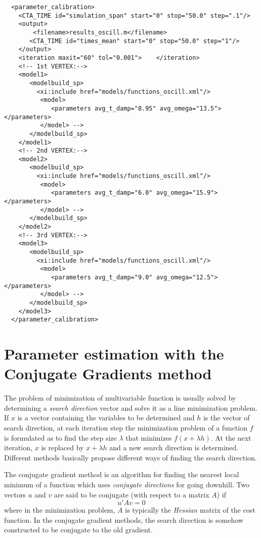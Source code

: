 \begin{verbatim}
  <parameter_calibration>
    <CTA_TIME id="simulation_span" start="0" stop="50.0" step=".1"/>
    <output>
        <filename>results_oscill.m</filename> 
       <CTA_TIME id="times_mean" start="0" stop="50.0" step="1"/>
    </output>
    <iteration maxit="60" tol="0.001">    </iteration>
    <!-- 1st VERTEX:-->
    <model1>
       <modelbuild_sp>
         <xi:include href="models/functions_oscill.xml"/>
          <model>  
             <parameters avg_t_damp="8.95" avg_omega="13.5"> </parameters> 
          </model> -->  
       </modelbuild_sp> 
    </model1>
    <!-- 2nd VERTEX:-->
    <model2>
       <modelbuild_sp>
         <xi:include href="models/functions_oscill.xml"/>
          <model>  
             <parameters avg_t_damp="6.0" avg_omega="15.9"> </parameters> 
          </model> -->  
       </modelbuild_sp> 
    </model2>
    <!-- 3rd VERTEX:-->
    <model3>
       <modelbuild_sp>
         <xi:include href="models/functions_oscill.xml"/>
          <model>  
             <parameters avg_t_damp="9.0" avg_omega="12.5"> </parameters> 
          </model> -->  
       </modelbuild_sp> 
    </model3>
  </parameter_calibration>
\end{verbatim}

\section{Parameter estimation with the Conjugate Gradients method}
\label{sssec.conjugrad}
The problem of minimization of multivariable function is usually solved by
determining a \emph{search direction} vector and solve it as a line
minimization problem. If $x$ is a vector containing the variables to be
determined and $h$ is the vector of search direction, at each iteration
step the minimization problem of a function $f$ is formulated as to find
the step size $\lambda$ that minimizes $f(x+\lambda h)$. At the next
iteration, $x$ is replaced by $x+\lambda h$ and a new search direction is
determined. Different methods basically propose different ways of finding
the search direction.

The conjugate gradient method is an algorithm for finding the nearest local
minimum of a function which uses \emph{conjugate directions} for going
downhill. Two vectors $u$ and $v$ are said to be conjugate (with respect to
a matrix $A$) if
\begin{equation}
   u'Av=0
\end{equation}
where in the minimization problem, $A$ is typically the \emph{Hessian}
matrix of the cost function. In the conjugate gradient methods, the search
direction is somehow constructed to be conjugate to the old gradient.

